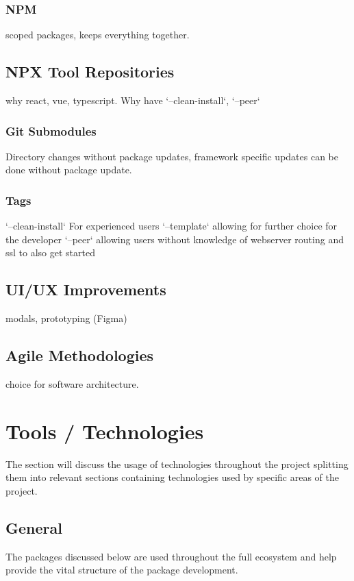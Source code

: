 \documentclass{l4proj}
\begin{document}
\subsection{NPM}
\text scoped packages, keeps everything together.
\section{NPX Tool Repositories}
\text why react, vue, typescript. Why have `--clean-install`, `--peer`
\subsection{Git Submodules}
\text Directory changes without package updates, framework specific updates can be done without package update.
\subsection{Tags}
\text `--clean-install` For experienced users `--template` allowing for further choice for the developer `--peer` allowing users without knowledge of webserver routing and ssl to also get started
\section{UI/UX Improvements}
\text modals, prototyping (Figma)
\section{Agile Methodologies}
\text choice for software architecture.
\chapter{Tools / Technologies}

The section will discuss the usage of technologies throughout the project splitting them into relevant sections containing technologies used by specific areas of the project.

\section{General}

The packages discussed below are used throughout the full ecosystem and help provide the vital structure of the package development.
\end{document}
